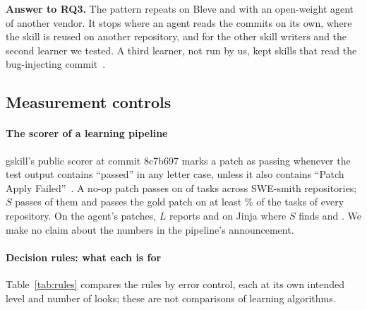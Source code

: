 \documentclass[sigconf,review,anonymous]{acmart}
\begin{document}
\noindent\textbf{Answer to RQ3.} The pattern repeats on Bleve and with an open-weight agent of
another vendor. It stops where an agent reads the commits on its own, where the skill is reused on
another repository, and for the other skill writers and the second learner we tested. A third
learner, not run by us, kept skills that read the bug-injecting commit~\cite{valve_2609_32990}.

\subsection{Measurement controls}\label{sec:measurement}
\paragraph{The scorer of a learning pipeline}
gskill's public scorer at commit 8c7b697 marks a patch as passing whenever the test output contains
``passed'' in any letter case, unless it also contains ``Patch Apply Failed''~\cite{gskill_swe_harness}.
A no-op patch passes on \nfzeroLNoop{} of \nfzeroN{} tasks across \nfzeroRepos{} SWE-smith
repositories; $S$ passes \nfzeroSNoop{} of them and passes the gold patch on at least
\nfzeroGoldMinPct\% of the tasks of every repository. On the agent's patches, $L$ reports
\njinjaLNone{} and \njinjaLSkill{} on Jinja where $S$ finds \njinjaNone{} and \njinjaSkill{}. We make
no claim about the numbers in the pipeline's announcement.

\paragraph{Decision rules: what each is for}
Table~\ref{tab:rules} compares the rules by error control, each at its own intended level and number
of looks; these are not comparisons of learning algorithms.
\end{document}
